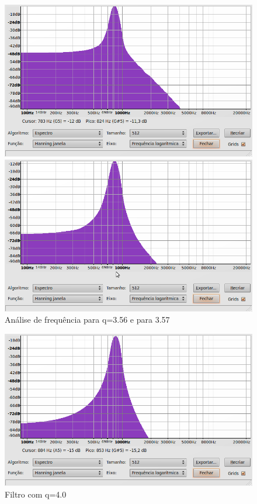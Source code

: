 \documentclass{article}
\begin{document}
\begin{figure}
  \centering
\parbox{2in}{
    \centering
    \includegraphics[scale=0.2]{q356.png}
    }%
\qquad	  
\parbox{2in}{
      \centering
      \includegraphics[scale=0.2]{q357.png}
      }%

  \caption{Análise de frequência para q=3.56 e para 3.57}
  \label{fig:qs}
\end{figure}




\begin{figure}
\centering
\includegraphics[scale=0.1]{q4.png}\caption{Filtro com q=4.0}\label{fig:q=4.0}
\end{figure}
\end{document}
